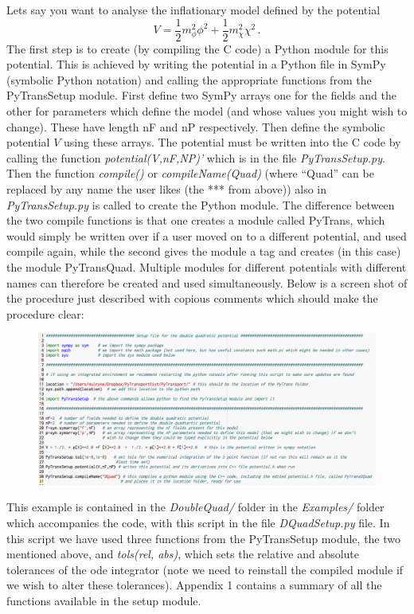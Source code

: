 \documentclass[10pt,
amsmath,amssymb,
aps,prd,nofootinbib,eqsecnum,a4paper]{revtex4}
\def\be{\begin{equation}}
\def\ee{\end{equation}}
\newcommand{\CC}{C\nolinebreak\hspace{-.05em}\raisebox{.4ex}{\tiny\bf +}\nolinebreak\hspace{-.10em}\raisebox{.4ex}{\tiny\bf +}}
\def\CC{{C\nolinebreak[4]\hspace{-.05em}\raisebox{.4ex}{\tiny\bf ++}}}
\def\S{ }
\begin{document}
Lets say you want to analyse the inflationary model defined by the potential
\be
V=\frac{1}{2} m^2_{\phi} \phi^2 + \frac{1}{2} m^2_{\chi} \chi^2\,.
\ee
The first step is to create (by compiling the \CC \S  code) a Python module for this potential. This is achieved by writing 
the potential in a Python file in SymPy (symbolic Python notation) and calling the 
appropriate functions from the { PyTransSetup module}. First define two SymPy 
arrays one for the fields and the other for parameters which 
define the model (and whose values you might wish to change). These have length nF and nP respectively. 
Then define the symbolic potential $V$ using these arrays. The potential must be written into the 
\CC \S  code by calling the function {\it potential(V,nF,NP)'}  which is in the file {\it PyTransSetup.py}.  
Then the function {\it compile()} or {\it compileName(Quad)} 
(where ``Quad'' can be replaced by any name the user likes (the *** from above)) also in 
{\it PyTransSetup.py} is called to create the Python module. The difference between the two compile 
functions is that one creates a module called { PyTrans}, which would simply be  written over if a user moved on 
to a different potential, and used compile again, while the second gives the module a tag and creates (in this case) 
the module PyTransQuad. Multiple modules for different potentials with different names can therefore be created and 
used simultaneously. Below is a screen shot of the procedure just described with copious comments which should 
make the procedure clear:

\begin{figure}[H]
\centering
\includegraphics[width=18cm]{shot1c}
\end{figure}

This example is contained in the {\it DoubleQuad/} folder in the {\it Examples/} folder which accompanies the code, with this script in the file {\it DQuadSetup.py} file. In this script 
we have used three functions from the PyTransSetup module, the two mentioned above, and {\it tols(rel, abs)}, 
which sets 
the relative and absolute tolerances of the ode integrator (note we need to reinstall the compiled 
module if we wish to alter these tolerances). Appendix 1 contains a summary of all the functions 
available in the setup module.
\end{document}
